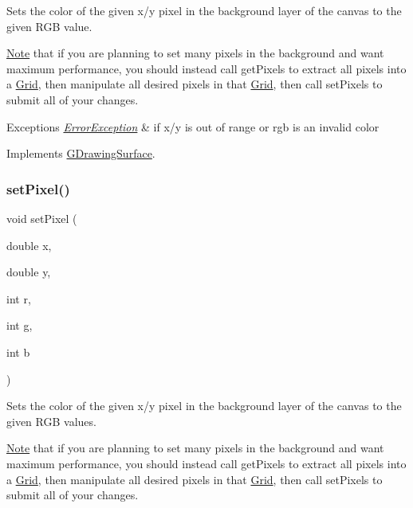 Sets the color of the given x/y pixel in the background layer of the canvas to the given R\+GB value. 

\mbox{\hyperlink{classNote}{Note}} that if you are planning to set many pixels in the background and want maximum performance, you should instead call get\+Pixels to extract all pixels into a \mbox{\hyperlink{classGrid}{Grid}}, then manipulate all desired pixels in that \mbox{\hyperlink{classGrid}{Grid}}, then call set\+Pixels to submit all of your changes.


\begin{DoxyExceptions}{Exceptions}
{\em \mbox{\hyperlink{classErrorException}{Error\+Exception}}} & if x/y is out of range or rgb is an invalid color \\
\hline
\end{DoxyExceptions}


Implements \mbox{\hyperlink{classGDrawingSurface_ac9f0a75ccb0abe1123046bab56479b84}{G\+Drawing\+Surface}}.

\mbox{\label{classGCanvas_af9aca140f86a6de6a4368d41349dd57c}} 
\subsubsection{\texorpdfstring{set\+Pixel()}{setPixel()}\hspace{0.1cm}{\footnotesize\ttfamily [3/3]}}
{\footnotesize\ttfamily void set\+Pixel (\begin{DoxyParamCaption}\item[{double}]{x,  }\item[{double}]{y,  }\item[{int}]{r,  }\item[{int}]{g,  }\item[{int}]{b }\end{DoxyParamCaption})\hspace{0.3cm}{\ttfamily [virtual]}}



Sets the color of the given x/y pixel in the background layer of the canvas to the given R\+GB values. 

\mbox{\hyperlink{classNote}{Note}} that if you are planning to set many pixels in the background and want maximum performance, you should instead call get\+Pixels to extract all pixels into a \mbox{\hyperlink{classGrid}{Grid}}, then manipulate all desired pixels in that \mbox{\hyperlink{classGrid}{Grid}}, then call set\+Pixels to submit all of your changes.


